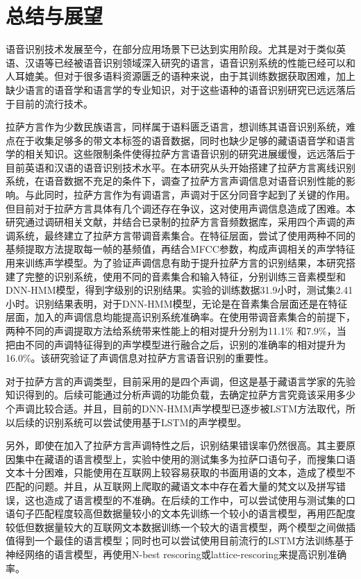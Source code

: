 
\chapter{总结与展望}
语音识别技术发展至今，在部分应用场景下已达到实用阶段。尤其是对于类似英语、汉语等已经被语音识别领域深入研究的语言，语音识别系统的性能已经可以和人耳媲美。但对于很多语料资源匮乏的语种来说，由于其训练数据获取困难，加上缺少语言的语音学和语言学的专业知识，对于这些语种的语音识别研究已远远落后于目前的流行技术。

拉萨方言作为少数民族语言，同样属于语料匮乏语言，想训练其语音识别系统，难点在于收集足够多的带文本标签的语音数据，同时也缺少足够的藏语语音学和语言学的相关知识。这些限制条件使得拉萨方言语音识别的研究进展缓慢，远远落后于目前英语和汉语的语音识别技术水平。在本研究从头开始搭建了拉萨方言离线识别系统，在语音数据不充足的条件下，调查了拉萨方言声调信息对语音识别性能的影响。与此同时，拉萨方言作为有调语言，声调对于区分同音字起到了关键的作用。但目前对于拉萨方言具体有几个调还存在争议，这对使用声调信息造成了困难。本研究通过调研相关文献，并结合已录制的拉萨方言音频数据库，采用四个声调的声调系统，最终建立了拉萨方言带调音素集合。在特征层面，尝试了使用两种不同的基频提取方法提取每一帧的基频值，再结合MFCC参数，构成声调相关的声学特征用来训练声学模型。为了验证声调信息有助于提升拉萨方言的识别结果，本研究搭建了完整的识别系统，使用不同的音素集合和输入特征，分别训练三音素模型和DNN-HMM模型，得到字级别的识别结果。实验的训练数据31.9小时，测试集2.41小时。识别结果表明，对于DNN-HMM模型，无论是在音素集合层面还是在特征层面，加入的声调信息均能提高识别系统准确率。在使用带调音素集合的前提下，两种不同的声调提取方法给系统带来性能上的相对提升分别为11.1\% 和7.9\%，当把由不同的声调特征得到的声学模型进行融合之后，识别的准确率的相对提升为16.0\%。该研究验证了声调信息对拉萨方言语音识别的重要性。

对于拉萨方言的声调类型，目前采用的是四个声调，但这是基于藏语言学家的先验知识得到的。后续可能通过分析声调的功能负载，去确定拉萨方言究竟该采用多少个声调比较合适。并且，目前的DNN-HMM声学模型已逐步被LSTM方法取代，所以后续的识别系统可以尝试使用基于LSTM的声学模型。

另外，即使在加入了拉萨方言声调特性之后，识别结果错误率仍然很高。其主要原因集中在藏语的语言模型上，实验中使用的测试集多为拉萨口语句子，而搜集口语文本十分困难，只能使用在互联网上较容易获取的书面用语的文本，造成了模型不匹配的问题。并且，从互联网上爬取的藏语文本中存在着大量的梵文以及拼写错误，这也造成了语言模型的不准确。在后续的工作中，可以尝试使用与测试集的口语句子匹配程度较高但数据量较小的文本先训练一个较小的语言模型，再用匹配度较低但数据量较大的互联网文本数据训练一个较大的语言模型，两个模型之间做插值得到一个最佳的语言模型；同时也可以尝试使用目前流行的LSTM方法训练基于神经网络的语言模型，再使用N-best rescoring或lattice-rescoring来提高识别准确率。
